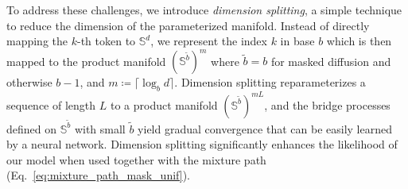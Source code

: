 To address these challenges, we introduce \emph{dimension splitting}, a simple technique to reduce the dimension of the parameterized manifold. 
Instead of directly mapping the $k$-th token to $\mathbb{S}^{d}$, we represent the index $k$ in base $b$ which is then mapped to the product manifold $(\mathbb{S}^{\tilde{b}})^{m}$ where $\tilde{b}=b$ for masked diffusion and otherwise $b-1$, and $m\coloneqq \lceil\log_{b}d\rceil$.
Dimension splitting reparameterizes a sequence of length $L$ to a product manifold $(\mathbb{S}^{\tilde{b}})^{mL}$, and the bridge processes defined on $\mathbb{S}^{\tilde{b}}$ with small $\tilde{b}$ yield gradual convergence that can be easily learned by a neural network.
Dimension splitting significantly enhances the likelihood of our model when used together with the mixture path (Eq.~\eqref{eq:mixture_path_mask_unif}).
